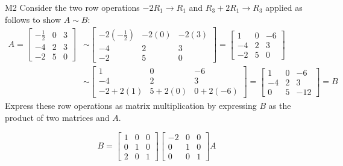 \begin{problem}{M2}
Consider the two row operations 
\(-2R_1\to R_1\) and \(R_3+2R_1\to R_3\)
applied as follows to show \(A\sim B\):
\begin{align*}
A
  =
\begin{bmatrix}
-\frac{1}{2}&0&3\\
-4&2&3\\
-2&5&0
\end{bmatrix}
  &\sim
\begin{bmatrix}
-2(-\frac{1}{2})&-2(0)&-2(3)\\
-4&2&3\\
-2&5&0
\end{bmatrix}
  =
\begin{bmatrix}
1&0&-6\\
-4&2&3\\
-2&5&0
\end{bmatrix}
  \\&\sim
\begin{bmatrix}
1&0&-6\\
-4&2&3\\
-2+2(1)&5+2(0)&0+2(-6)
\end{bmatrix}
  =
\begin{bmatrix}
1&0&-6\\
-4&2&3\\
0&5&-12
\end{bmatrix}
  = 
B
\end{align*}
Express these row operations as matrix multiplication
by expressing \(B\) as the product of two matrices and \(A\).
\end{problem}
\begin{solution}
\[
B
  =
\begin{bmatrix}
  1&0&0\\
  0&1&0\\
  2&0&1
\end{bmatrix}
\begin{bmatrix}
  -2&0&0\\
  0&1&0\\
  0&0&1
\end{bmatrix}
A
\]
\end{solution}


